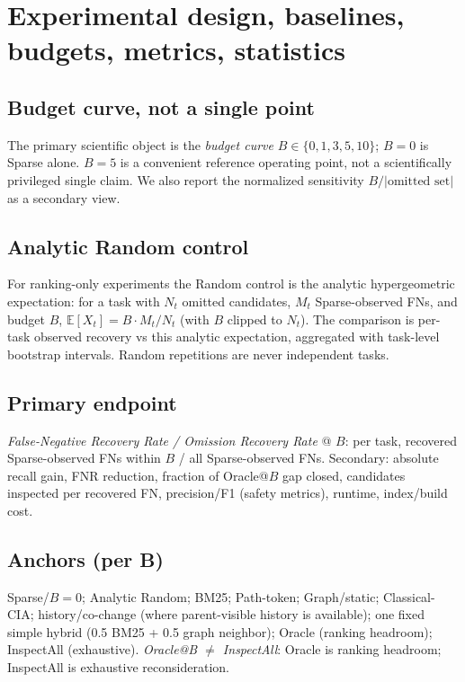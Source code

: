 \documentclass[11pt,a4paper]{article}
\begin{document}
\section{Experimental design, baselines, budgets, metrics, statistics}
\label{sec:design}

\subsection{Budget curve, not a single point}
The primary scientific object is the \emph{budget curve} $B \in \{0,1,3,5,10\}$;
$B{=}0$ is Sparse alone. $B{=}5$ is a convenient reference operating point, not
a scientifically privileged single claim. We also report the normalized
sensitivity $B / |\text{omitted set}|$ as a secondary view.

\subsection{Analytic Random control}
For ranking-only experiments the Random control is the analytic hypergeometric
expectation: for a task with $N_t$ omitted candidates, $M_t$ Sparse-observed
FNs, and budget $B$, $\mathbb{E}[X_t] = B \cdot M_t / N_t$ (with $B$ clipped to
$N_t$). The comparison is per-task observed recovery vs this analytic
expectation, aggregated with task-level bootstrap intervals. Random repetitions
are never independent tasks.

\subsection{Primary endpoint}
\emph{False-Negative Recovery Rate / Omission Recovery Rate} @ $B$: per task,
recovered Sparse-observed FNs within $B$ / all Sparse-observed FNs. Secondary:
absolute recall gain, FNR reduction, fraction of Oracle@$B$ gap closed,
candidates inspected per recovered FN, precision/F1 (safety metrics), runtime,
index/build cost.

\subsection{Anchors (per B)}
Sparse/$B{=}0$; Analytic Random; BM25; Path-token; Graph/static; Classical-CIA;
history/co-change (where parent-visible history is available); one fixed simple
hybrid (0.5 BM25 + 0.5 graph neighbor); Oracle (ranking headroom); InspectAll
(exhaustive). \emph{Oracle@B $\neq$ InspectAll}: Oracle is ranking headroom;
InspectAll is exhaustive reconsideration.
\end{document}
